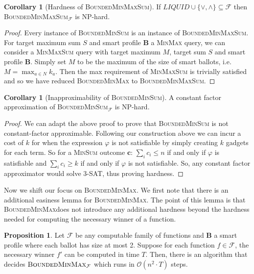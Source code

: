 \documentclass[11pt,a4paper, titlepage]{article}
\theoremstyle{definition}
\newtheorem{corollary}[theorem]{Corollary}
\newtheorem{proposition}[theorem]{Proposition}
\let\vec\mathbf
\newcommand{\BMM}{\textsc{BoundedMinMax}}
\begin{document}
\begin{corollary}[Hardness of \textsc{BoundedMinMaxSum}]
    If $ \mathit{LIQUID} \cup \{\lor, \land\} \subseteq \mathcal{F}$ then \textsc{BoundedMinMaxSum}$_\mathcal{F}$ is NP-hard. 
\end{corollary}

\begin{proof}
    Every instance of \textsc{BoundedMinSum} is an instance of \textsc{BoundedMinMaxSum}. For target maximum sum $S$ and smart profile $\vec{B}$ a \textsc{MinMax} query, we can consider a \textsc{MinMaxSum} query with target maximum $M$, target sum $S$ and smart profile $\vec{B}$. Simply set $M$ to be the maximum of the size of smart ballots, i.e. $M = \max_{a \in N} k_a$. Then the max requirement of \textsc{MinMaxSum} is trivially satisfied and so we have reduced \textsc{BoundedMinMax} to \textsc{BoundedMinMaxSum}.
\end{proof}


\begin{corollary}[Inapproximability of \textsc{BoundedMinSum}] A constant factor approximation of \textsc{BoundedMinSum}$_\mathcal{F}$ is NP-hard.    
\end{corollary}

\begin{proof}
    We can adapt the above proof to prove that \textsc{BoundedMinSum} is not constant-factor approximable. 
    Following our construction above we can incur a cost of $k$ for when the expression $\varphi$ is not satisfiable by simply creating $k$ gadgets for each term. 
    So for a \textsc{MinSum} outcome $\vec{c}$:   $\sum_i c_i \leq n$ if and only if $\varphi$ is satisfiable and $\sum_i c_i \geq k$ if and only if $\varphi$ is not satisfiable. 
    So, any constant factor approximator would solve \textsc{3-SAT}, thus proving hardness.
\end{proof}

Now we shift our focus on \textsc{BoundedMinMax}.
We first note that there is an additional easiness lemma for \BMM.
The point of this lemma is that \BMM does not introduce any additional hardness beyond the hardness needed for computing the necessary winner of a function.

\begin{proposition}
    Let $\mathcal{F}$ be any computable family of functions and $\vec{B}$ a smart profile where each ballot has size at most 2.
    Suppose for each function $f \in \mathcal{F}$, the necessary winner $f'$ can be computed in time $T$.
    Then, there is an algorithm that decides $\BMM_\mathcal{F}$ which runs in $\mathcal{O}(n^2\cdot T)$ steps. 
\end{proposition}
\end{document}
